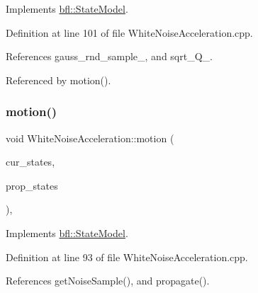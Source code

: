 Implements \mbox{\hyperlink{classbfl_1_1StateModel_ab1f0aa4c804b7de86c68294de3df76ee}{bfl\+::\+State\+Model}}.



Definition at line 101 of file White\+Noise\+Acceleration.\+cpp.



References gauss\+\_\+rnd\+\_\+sample\+\_\+, and sqrt\+\_\+\+Q\+\_\+.



Referenced by motion().

\mbox{\label{classbfl_1_1WhiteNoiseAcceleration_addb79c08bdf08b89629bdcd24e46d1b8}} 
\subsubsection{\texorpdfstring{motion()}{motion()}}
{\footnotesize\ttfamily void White\+Noise\+Acceleration\+::motion (\begin{DoxyParamCaption}\item[{const Eigen\+::\+Ref$<$ const Eigen\+::\+Matrix\+Xf $>$ \&}]{cur\+\_\+states,  }\item[{Eigen\+::\+Ref$<$ Eigen\+::\+Matrix\+Xf $>$}]{prop\+\_\+states }\end{DoxyParamCaption})\hspace{0.3cm}{\ttfamily [override]}, {\ttfamily [virtual]}}



Implements \mbox{\hyperlink{classbfl_1_1StateModel_a3601485697ae3445ec7ca753dbeb035c}{bfl\+::\+State\+Model}}.



Definition at line 93 of file White\+Noise\+Acceleration.\+cpp.



References get\+Noise\+Sample(), and propagate().

